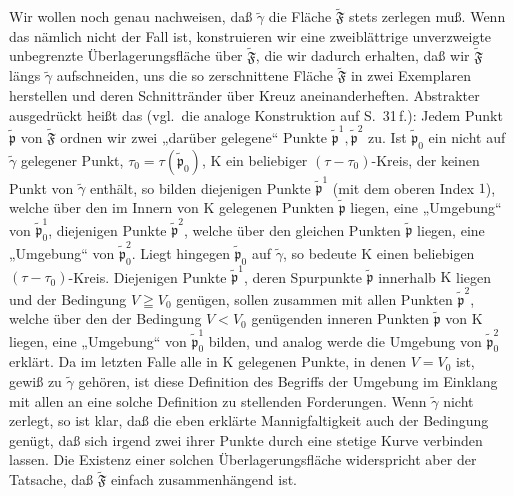 \documentclass{article}
\begin{document}
Wir wollen noch genau nachweisen, daß $\tilde{\gamma}$ die Fläche $\widetilde{\mathfrak{F}}$ stets zerlegen muß. Wenn das nämlich nicht der Fall ist, konstruieren wir eine zweiblättrige unverzweigte unbegrenzte Überlagerungsfläche über $\widetilde{\mathfrak{F}}$, die wir dadurch erhalten, daß wir $\widetilde{\mathfrak{F}}$ längs $\tilde{\gamma}$ aufschneiden, uns die so zerschnittene Fläche $\widetilde{\mathfrak{F}}$ in zwei Exemplaren herstellen und deren Schnittränder über Kreuz aneinanderheften. Abstrakter ausgedrückt heißt das (vgl.\ die analoge Konstruktion auf S.~31\,f.): Jedem Punkt $\tilde{\mathfrak{p}}$ von $\widetilde{\mathfrak{F}}$ ordnen wir zwei „darüber gelegene“ Punkte $\tilde{\mathfrak{p}}^1, \tilde{\mathfrak{p}}^2$ zu. Ist $\tilde{\mathfrak{p}}_0$ ein nicht auf $\tilde{\gamma}$ gelegener Punkt, $\tau_0 = \tau(\tilde{\mathfrak{p}}_0)$, $\mathrm{K}$ ein beliebiger $(\tau - \tau_0)$-Kreis, der keinen Punkt von $\tilde{\gamma}$ enthält, so bilden diejenigen Punkte $\tilde{\mathfrak{p}}^1$ (mit dem oberen Index $1$), welche über den im Innern von $\mathrm{K}$ gelegenen Punkten $\tilde{\mathfrak{p}}$ liegen, eine „Umgebung“ von $\tilde{\mathfrak{p}}_0^1$, diejenigen Punkte $\tilde{\mathfrak{p}}^2$, welche über den gleichen Punkten $\tilde{\mathfrak{p}}$ liegen, eine „Umgebung“ von $\tilde{\mathfrak{p}}_0^2$. Liegt hingegen $\tilde{\mathfrak{p}}_0$ auf $\tilde{\gamma}$, so bedeute $\mathrm{K}$ einen beliebigen $(\tau - \tau_0)$-Kreis. Diejenigen Punkte $\tilde{\mathfrak{p}}^1$, deren Spurpunkte $\tilde{\mathfrak{p}}$ innerhalb $\mathrm{K}$ liegen und der Bedingung $V \geqq V_0$ genügen, sollen zusammen mit allen Punkten $\tilde{\mathfrak{p}}^2$, welche über den der Bedingung $V < V_0$ genügenden inneren Punkten $\tilde{\mathfrak{p}}$ von $\mathrm{K}$ liegen, eine „Umgebung“ von $\tilde{\mathfrak{p}}_0^1$ bilden, und analog werde die Umgebung von $\tilde{\mathfrak{p}}_0^2$ erklärt. Da im letzten Falle alle in $\mathrm{K}$ gelegenen Punkte, in denen $V = V_0$ ist, gewiß zu $\tilde{\gamma}$ gehören, ist diese Definition des Begriffs der Umgebung im Einklang mit allen an eine solche Definition zu stellenden Forderungen. Wenn $\tilde{\gamma}$ nicht zerlegt, so ist klar, daß die eben erklärte Mannigfaltigkeit auch der Bedingung genügt, daß sich irgend zwei ihrer Punkte durch eine stetige Kurve verbinden lassen. Die Existenz einer solchen Überlagerungsfläche widerspricht aber der Tatsache, daß $\widetilde{\mathfrak{F}}$ einfach zusammenhängend ist.

\end{document}
